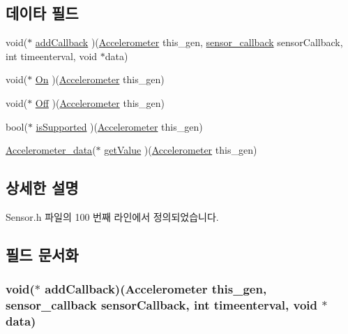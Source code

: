 \subsection*{데이타 필드}
\begin{DoxyCompactItemize}
\item 
void($\ast$ \hyperlink{struct___accelerometer_a7965ed0fc100c12c6c00f4fb85518f35}{add\-Callback} )(\hyperlink{_sensor_8h_a9ad3b9b652159c9011a7dc9023d0d914}{Accelerometer} this\-\_\-gen, \hyperlink{_sensor_8h_ad8114207845fc5e0aa30832f0c718cd6}{sensor\-\_\-callback} sensor\-Callback, int timeenterval, void $\ast$data)
\item 
void($\ast$ \hyperlink{struct___accelerometer_ad916cc9a71168f051a7cdfaf8da436ff}{On} )(\hyperlink{_sensor_8h_a9ad3b9b652159c9011a7dc9023d0d914}{Accelerometer} this\-\_\-gen)
\item 
void($\ast$ \hyperlink{struct___accelerometer_a6bee74ed7ad41e18037dd35d10e5ca65}{Off} )(\hyperlink{_sensor_8h_a9ad3b9b652159c9011a7dc9023d0d914}{Accelerometer} this\-\_\-gen)
\item 
bool($\ast$ \hyperlink{struct___accelerometer_a0c01b8a5a915f39afb4429cbe3ee6d2c}{is\-Supported} )(\hyperlink{_sensor_8h_a9ad3b9b652159c9011a7dc9023d0d914}{Accelerometer} this\-\_\-gen)
\item 
\hyperlink{_sensor_8h_aad4991bb642841f2928476723063a8c6}{Accelerometer\-\_\-data}($\ast$ \hyperlink{struct___accelerometer_a8c75dfb5dbc8f9da5ea69ef2fb597185}{get\-Value} )(\hyperlink{_sensor_8h_a9ad3b9b652159c9011a7dc9023d0d914}{Accelerometer} this\-\_\-gen)
\end{DoxyCompactItemize}


\subsection{상세한 설명}


Sensor.\-h 파일의 100 번째 라인에서 정의되었습니다.



\subsection{필드 문서화}
\hypertarget{struct___accelerometer_a7965ed0fc100c12c6c00f4fb85518f35}{
\subsubsection[{add\-Callback}]{\setlength{\rightskip}{0pt plus 5cm}void($\ast$  add\-Callback)({\bf Accelerometer} this\-\_\-gen, {\bf sensor\-\_\-callback} sensor\-Callback, int timeenterval, void $\ast$data)}}\label{struct___accelerometer_a7965ed0fc100c12c6c00f4fb85518f35}


